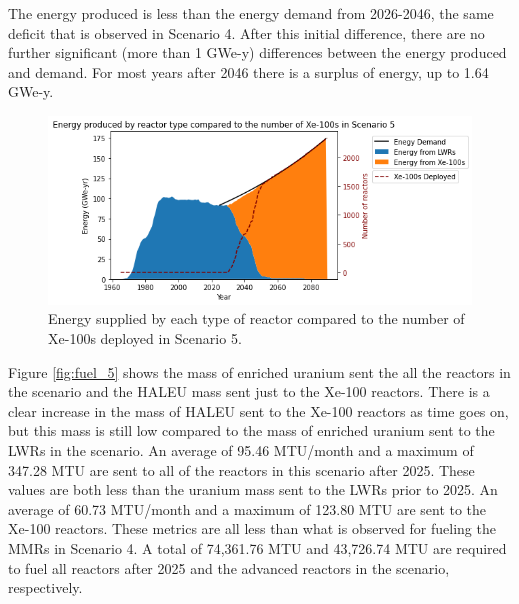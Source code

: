 The energy produced is less than the energy demand from 
2026-2046, the same deficit that is observed in Scenario 4. After this 
initial difference, there are no further significant (more than 
1 GWe-y) differences between 
the energy produced and demand. For most years after 2046 there 
is a surplus of energy, up to 1.64 GWe-y. 

\begin{figure}
    \centering 
    \includegraphics[width=\textwidth]{../figures/energy_scenario5.png}
    \caption{Energy supplied by each type of reactor compared to the number of 
    Xe-100s deployed in Scenario 5.}
    \label{fig:energy_rx_5}
\end{figure}

Figure \ref{fig:fuel_5} shows the mass of enriched uranium sent the all  
the reactors in the scenario and the \gls{HALEU} mass sent just to the 
Xe-100 reactors. There is a clear increase in the mass of \gls{HALEU} sent 
to the Xe-100 reactors as time goes on, but this mass is still  
low compared to the mass of enriched uranium sent to the \glspl{LWR} in 
the scenario. An average of 95.46 MTU/month and a maximum of 347.28 MTU 
are sent to all of the reactors in this scenario after 2025. These 
values are both less than the uranium mass sent to the 
\glspl{LWR} prior to 2025. An average of 
60.73 MTU/month and a maximum of 123.80 MTU are sent to the Xe-100 reactors. 
These metrics are all less than what is observed 
for fueling the \glspl{MMR} in Scenario 4. A total of 74,361.76 MTU and 
43,726.74 MTU are required to fuel all reactors after 2025 and the advanced reactors 
in the scenario, respectively.


